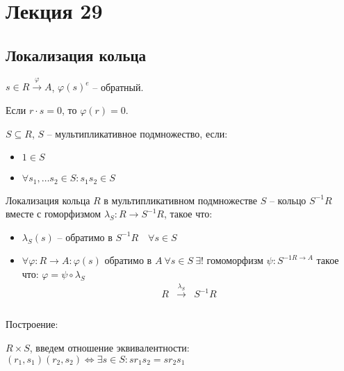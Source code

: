 \documentclass[11pt]{book}
\theoremstyle{definition}
\theoremstyle{plain}
\theoremstyle{plain}
\theoremstyle{definition}
\theoremstyle{remark}
\begin{document}
\section{Лекция 29}
\subsection{Локализация кольца}
$ s \in  R \stackrel{ \varphi } \longrightarrow A$, $ \varphi (s) ^{e}$ -- обратный.

Если $ r \cdot s = 0$, то $ \varphi (r) = 0$.
\begin{defn}
    $ S \subseteq R$, $ S$ -- мультипликативное подмножество, если:
    \begin{itemize}
	\item $ 1 \in  S$ 
	    \item  $\forall s_1, \ldots  s_2 \in  S: s_1 s_2 \in S$
    \end{itemize}
\end{defn}
\begin{defn}
    Локализация кольца $ R$ в мультипликативном подмножестве $ S$ -- кольцо $ S^{-1}R$ вместе с гоморфизмом $ \lambda_S: R  \to S^{-1}R $, такое что:
    \begin{itemize}
	\item  $ \lambda_S(s)$ -- обратимо в $ S^{-1}R \quad \forall s \in S$ 
	\item $ \forall \varphi : R \to  A: \varphi (s) $ обратимо в $ A ~ \forall s \in  S ~ \exists ! $ гомоморфизм $ \psi : S^{-1 R \to  A} $ такое что: $ \varphi  = \psi \circ \lambda_S$
	    $$
	    \begin{array}{ccc} %
		R & \stackrel{\lambda _S}  \longrightarrow&  S^{-1}R\\  
			\\

	    \end{array}
	    $$
    \end{itemize}
\end{defn}
Построение:

$ R \times S$, введем отношение эквивалентности: $ (r_1, s_1) (r_2, s_2) \Leftrightarrow \exists s \in  S: s r_1 s_2 = s r_2 s_1 $
\end{document}
